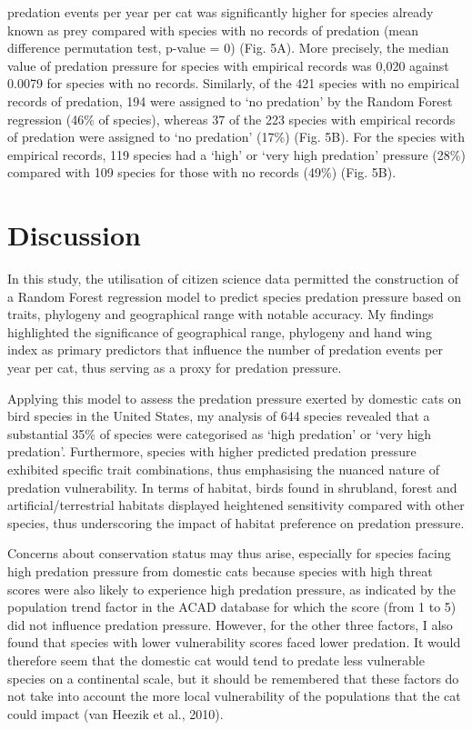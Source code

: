 \documentclass[
  super,
  review,
  3p]{elsarticle}
\begin{document}
predation events per year per cat was significantly higher for species
already known as prey compared with species with no records of predation
(mean difference permutation test, p-value = 0) (Fig. 5A). More
precisely, the median value of predation pressure for species with
empirical records was 0,020 against 0.0079 for species with no records.
Similarly, of the 421 species with no empirical records of predation,
194 were assigned to `no predation' by the Random Forest regression
(46\% of species), whereas 37 of the 223 species with empirical records
of predation were assigned to `no predation' (17\%) (Fig. 5B). For the
species with empirical records, 119 species had a `high' or `very high
predation' pressure (28\%) compared with 109 species for those with no
records (49\%) (Fig. 5B).

\hypertarget{discussion}{%
\section{\texorpdfstring{\textbf{Discussion}}{Discussion}}\label{discussion}}

In this study, the utilisation of citizen science data permitted the
construction of a Random Forest regression model to predict species
predation pressure based on traits, phylogeny and geographical range
with notable accuracy. My findings highlighted the significance of
geographical range, phylogeny and hand wing index as primary predictors
that influence the number of predation events per year per cat, thus
serving as a proxy for predation pressure.

Applying this model to assess the predation pressure exerted by domestic
cats on bird species in the United States, my analysis of 644 species
revealed that a substantial 35\% of species were categorised as `high
predation' or `very high predation'. Furthermore, species with higher
predicted predation pressure exhibited specific trait combinations, thus
emphasising the nuanced nature of predation vulnerability. In terms of
habitat, birds found in shrubland, forest and artificial/terrestrial
habitats displayed heightened sensitivity compared with other species,
thus underscoring the impact of habitat preference on predation
pressure.

Concerns about conservation status may thus arise, especially for
species facing high predation pressure from domestic cats because
species with high threat scores were also likely to experience high
predation pressure, as indicated by the population trend factor in the
ACAD database for which the score (from 1 to 5) did not influence
predation pressure. However, for the other three factors, I also found
that species with lower vulnerability scores faced lower predation. It
would therefore seem that the domestic cat would tend to predate less
vulnerable species on a continental scale, but it should be remembered
that these factors do not take into account the more local vulnerability
of the populations that the cat could impact (van Heezik et al., 2010).
\end{document}
